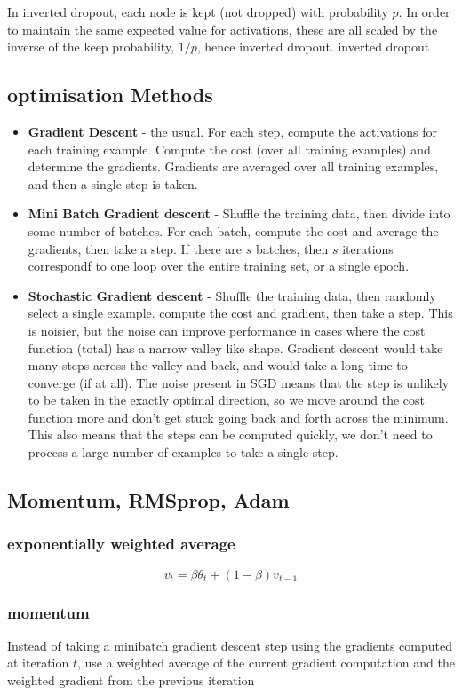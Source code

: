 \documentclass{article}
\begin{document}
In inverted dropout, each node is kept (not dropped) with probability $p$. In order to maintain the same expected value for activations, these are all scaled by the inverse of the keep probability, $1/p$, hence inverted dropout.
inverted dropout

\subsection{optimisation Methods}
\begin{itemize}
    \item {\bf Gradient Descent} - the usual. For each step, compute the activations for each training example. Compute the cost (over all training examples) and determine the gradients. Gradients are averaged over all training examples, and then a single step is taken. 
    \item {\bf Mini Batch Gradient descent} - Shuffle the training data, then divide into some number of batches. For each batch, compute the cost and average the gradients, then take a step. If there are $s$ batches, then $s$ iterations correspondf to one loop over the entire training set, or a single epoch.
    \item {\bf Stochastic Gradient descent} - Shuffle the training data, then randomly select a single example. compute the cost and gradient, then take a step. This is noisier, but the noise can improve performance in cases where the cost function (total) has a narrow valley like shape. Gradient descent would take many steps across the valley and back, and would take a long time to converge (if at all). The noise present in SGD means that the step is unlikely to be taken in the exactly optimal direction, so we move around the cost function more and don't get stuck going back and forth across the minimum. This also means that the steps can be computed quickly, we don't need to process a large number of examples to take a single step.
\end{itemize}
\subsection{ Momentum, RMSprop, Adam}
\subsubsection{exponentially weighted average}
\begin{equation}
v_t = \beta \theta_t + (1-\beta)v_{t-1}
\end{equation}
\subsubsection{momentum}
Instead of taking a minibatch gradient descent step using the gradients computed at iteration $t$, use a weighted average of the current gradient computation and the weighted gradient from the previous iteration
\end{document}
